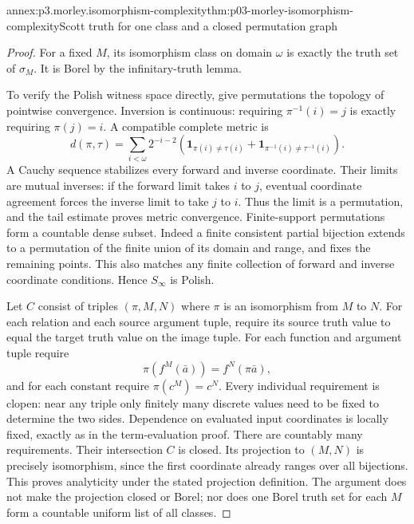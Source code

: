 \begin{annexitem}{annex:p3.morley.isomorphism-complexity}{thm:p03-morley-isomorphism-complexity}{Scott truth for one class and a closed permutation graph}
\begin{proof}
For a fixed \(M\), its isomorphism class on
domain \(\omega\) is exactly the truth set
of \(\sigma_M\). It is Borel by the
infinitary-truth lemma.

To verify the Polish witness space directly,
give permutations the topology of pointwise
convergence. Inversion is continuous: requiring
\(\pi^{-1}(i)=j\) is exactly requiring
\(\pi(j)=i\). A compatible complete metric is
\[
 d(\pi,\tau)=\sum_{i<\omega}2^{-i-2}
  \left(\mathbf1_{\pi(i)\ne\tau(i)}
       +\mathbf1_{\pi^{-1}(i)\ne\tau^{-1}(i)}\right).
\]
A Cauchy sequence stabilizes every forward
and inverse coordinate. Their limits are
mutual inverses: if the forward limit takes
\(i\) to \(j\), eventual coordinate agreement
forces the inverse limit to take \(j\) to \(i\).
Thus the limit is a permutation, and the
tail estimate proves metric convergence.
Finite-support permutations form a countable
dense subset. Indeed a finite consistent
partial bijection extends to a permutation
of the finite union of its domain and range,
and fixes the remaining points.
This also matches any finite collection of
forward and inverse coordinate conditions.
Hence \(S_\infty\) is Polish.

Let \(C\) consist of triples \((\pi,M,N)\)
where \(\pi\) is an isomorphism from \(M\) to \(N\).
For each relation and each source argument tuple,
require its source truth value to equal the
target truth value on the image tuple.
For each function and argument tuple require
\[
 \pi(f^M(\bar a))=f^N(\pi\bar a),
\]
and for each constant require
\(\pi(c^M)=c^N\).
Every individual requirement is clopen:
near any triple only finitely many discrete
values need to be fixed to determine the
two sides. Dependence on evaluated input
coordinates is locally fixed, exactly as
in the term-evaluation proof.
There are countably many requirements.
Their intersection \(C\) is closed.
Its projection to \((M,N)\) is precisely
isomorphism, since the first coordinate
already ranges over all bijections.
This proves analyticity under the stated
projection definition.
The argument does not make the projection
closed or Borel; nor does one Borel truth
set for each \(M\) form a countable uniform
list of all classes.
\end{proof}
\end{annexitem}

